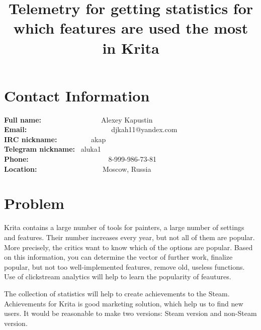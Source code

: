\documentclass[]{article}
\title{Telemetry for getting statistics for which features are used the most in Krita} %
\begin{document}
\maketitle
\section{Contact Information}
\textbf{Full name:}~~~~~~~~~~~~~~~~~Alexey Kapustin \\
\textbf{Email:}~~~~~~~~~~~~~~~~~~~~~~~~djkah11@yandex.com \\
\textbf{IRC nickname:      }~~~~~~~~~akap \\
\textbf{Telegram nickname: }~aluka1 \\
\textbf{Phone: }~~~~~~~~~~~~~~~~~~~~~~8-999-986-73-81 \\
\textbf{Location:          }~~~~~~~~~~~~~~~~~~Moscow, Russia
\section{Problem}
Krita contains a large number of tools for painters, a large number of settings and features.
Their number increases every year, but not all of them are popular. More precisely, the critics want to know which of the options are popular. Based on this information, you can determine the vector of further work, finalize popular, but not too well-implemented features, remove old, useless functions. Use of clickstream analytics will help to learn the popularity of feautures.

The collection of statistics will help to create  achievements to the Steam. Achievements for Krita is good marketing solution, which help us to find new users. It would be reasonable to make two versions: Steam version and non-Steam version.

\end{document}
